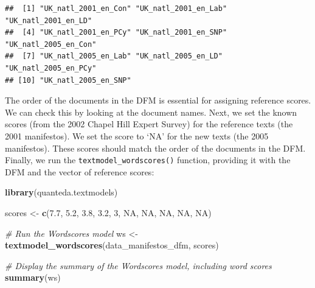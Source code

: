\documentclass[
]{book}
\newenvironment{Shaded}{\begin{snugshade}}{\end{snugshade}}
\newcommand{\AttributeTok}[1]{\textcolor[rgb]{0.13,0.29,0.53}{#1}}
\newcommand{\CommentTok}[1]{\textcolor[rgb]{0.56,0.35,0.01}{\textit{#1}}}
\newcommand{\ConstantTok}[1]{\textcolor[rgb]{0.56,0.35,0.01}{#1}}
\newcommand{\DecValTok}[1]{\textcolor[rgb]{0.00,0.00,0.81}{#1}}
\newcommand{\FloatTok}[1]{\textcolor[rgb]{0.00,0.00,0.81}{#1}}
\newcommand{\FunctionTok}[1]{\textcolor[rgb]{0.13,0.29,0.53}{\textbf{#1}}}
\newcommand{\NormalTok}[1]{#1}
\newcommand{\OtherTok}[1]{\textcolor[rgb]{0.56,0.35,0.01}{#1}}
\newcommand{\SpecialCharTok}[1]{\textcolor[rgb]{0.81,0.36,0.00}{\textbf{#1}}}
\newcommand{\StringTok}[1]{\textcolor[rgb]{0.31,0.60,0.02}{#1}}
\begin{document}
\begin{Shaded}
\end{Shaded}

\begin{verbatim}
##  [1] "UK_natl_2001_en_Con" "UK_natl_2001_en_Lab" "UK_natl_2001_en_LD" 
##  [4] "UK_natl_2001_en_PCy" "UK_natl_2001_en_SNP" "UK_natl_2005_en_Con"
##  [7] "UK_natl_2005_en_Lab" "UK_natl_2005_en_LD"  "UK_natl_2005_en_PCy"
## [10] "UK_natl_2005_en_SNP"
\end{verbatim}

The order of the documents in the DFM is essential for assigning reference scores. We can check this by looking at the document names. Next, we set the known scores (from the 2002 Chapel Hill Expert Survey) for the reference texts (the 2001 manifestos). We set the score to `NA' for the new texts (the 2005 manifestos). These scores should match the order of the documents in the DFM. Finally, we run the \texttt{textmodel\_wordscores()} function, providing it with the DFM and the vector of reference scores:

\begin{Shaded}
\begin{Highlighting}[]
\FunctionTok{library}\NormalTok{(quanteda.textmodels)}

\NormalTok{scores }\OtherTok{\textless{}{-}} \FunctionTok{c}\NormalTok{(}\FloatTok{7.7}\NormalTok{, }\FloatTok{5.2}\NormalTok{, }\FloatTok{3.8}\NormalTok{, }\FloatTok{3.2}\NormalTok{, }\DecValTok{3}\NormalTok{, }\ConstantTok{NA}\NormalTok{, }\ConstantTok{NA}\NormalTok{, }\ConstantTok{NA}\NormalTok{, }\ConstantTok{NA}\NormalTok{, }\ConstantTok{NA}\NormalTok{)}

\CommentTok{\# Run the Wordscores model}
\NormalTok{ws }\OtherTok{\textless{}{-}} \FunctionTok{textmodel\_wordscores}\NormalTok{(data\_manifestos\_dfm, scores)}

\CommentTok{\# Display the summary of the Wordscores model, including word scores}
\FunctionTok{summary}\NormalTok{(ws)}
\end{Highlighting}
\end{Shaded}
\end{document}
